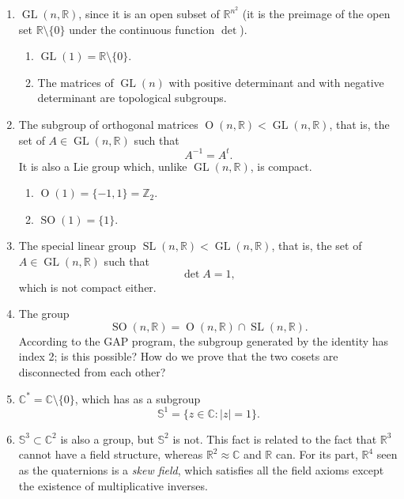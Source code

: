 \begin{example}
\label{example-matrix-groups}
\begin{enumerate}
\item $\operatorname{GL}(n,\mathbb{R})$,
since it is an open subset of
$\mathbb{R}^{n^2}$ (it is the preimage
of the open set
$\mathbb{R}\setminus\{0\}$ under the
continuous function $\det$).
\begin{enumerate}
\item $\operatorname{GL}(1)
=\mathbb{R}\setminus\{0\}$.
\item The matrices of
$\operatorname{GL}(n)$ with positive
determinant and with negative
determinant are topological subgroups.
\end{enumerate}
\item The subgroup of orthogonal
matrices
$\operatorname{O}(n,\mathbb{R})
<\operatorname{GL}(n,\mathbb{R})$,
that is, the set of
$A\in\operatorname{GL}(n,\mathbb{R})$
such that
$$
A^{-1}=A^t.
$$
It is also a Lie group which, unlike
$\operatorname{GL}(n,\mathbb{R})$, is
compact.
\begin{enumerate}
\item $\operatorname{O}(1)
=\{-1,1\}=\mathbb{Z}_2$.
\item $\operatorname{SO}(1)=\{1\}$.
\end{enumerate}
\item The special linear group
$\operatorname{SL}(n,\mathbb{R})
<\operatorname{GL}(n,\mathbb{R})$,
that is, the set of
$A\in\operatorname{GL}(n,\mathbb{R})$
such that
$$
\det A=1,
$$
which is not compact either.
\item The group
$$
\operatorname{SO}(n,\mathbb{R})
=\operatorname{O}(n,\mathbb{R})
\cap\operatorname{SL}(n,\mathbb{R}).
$$
According to the GAP program, the
subgroup generated by the identity has
index 2; is this possible? How do we
prove that the two cosets are
disconnected from each other?
\item $\mathbb{C}^*
=\mathbb{C}\setminus\{0\}$, which has
as a subgroup
$$
\mathbb{S}^1
=\{z\in\mathbb{C}:|z|=1\}.
$$
\item $\mathbb{S}^3\subset\mathbb{C}^2$
is also a group, but $\mathbb{S}^2$ is
not. This fact is related to the fact
that $\mathbb{R}^3$ cannot have a field
structure, whereas
$\mathbb{R}^2\approx\mathbb{C}$ and
$\mathbb{R}$ can. For its part,
$\mathbb{R}^4$ seen as the quaternions
is a {\it skew field}, which satisfies
all the field axioms except the
existence of multiplicative inverses.
\end{enumerate}
\end{example}

